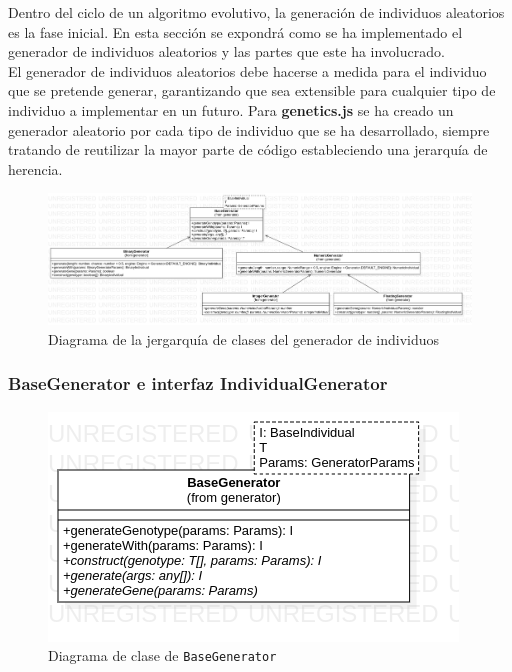 Dentro del ciclo de un algoritmo evolutivo, la generación de individuos aleatorios es la fase inicial. En esta sección se expondrá como se ha implementado el generador de individuos aleatorios y las partes que este ha involucrado. \\

El generador de individuos aleatorios debe hacerse a medida para el individuo que se pretende generar, garantizando que sea extensible para cualquier tipo de individuo a implementar en un futuro. Para \textbf{genetics.js} se ha creado un generador aleatorio por cada tipo de individuo que se ha desarrollado, siempre tratando de reutilizar la mayor parte de código estableciendo una jerarquía de herencia.

\begin{figure}[ht]
    \centering
    \includegraphics[scale=0.3]{mem/images/cap-4/4.2.3(Generador)/Generator.png}
    \caption{Diagrama de la jergarquía de clases del generador de individuos}
    \label{fig:generator-uml}
\end{figure}

\subsubsection{BaseGenerator e interfaz IndividualGenerator}

\begin{figure}[ht]
    \centering
    \includegraphics[scale=0.5]{mem/images/cap-4/4.2.3(Generador)/BaseGenerator.png}
    \caption{Diagrama de clase de \texttt{BaseGenerator}}
    \label{fig:generator-uml}
\end{figure}

